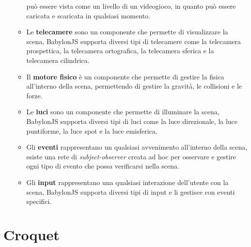 \begin{itemize}
\begin{itemize}
        può essere vista come un livello di un videogioco, in quanto può essere caricata e scaricata in qualsiasi momento.
        \item Le \textbf{telecamere} sono un componente che permette di visualizzare la scena, BabylonJS supporta diversi tipi di telecamere come la telecamera prospettica, la telecamera ortografica,
        la telecamera sferica e la telecamera cilindrica.
        \item Il \textbf{motore fisico} è un componente che permette di gestire la fisica all'interno della scena, permettendo di gestire la gravità, le collisioni e le forze.
        \item Le \textbf{luci} sono un componente che permette di illuminare la scena, BabylonJS supporta diversi tipi di luci come la luce direzionale, la luce puntiforme, la luce spot e la luce
        emisferica.
        \item Gli \textbf{eventi} rappresentano un qualsiasi avvenimento all'interno della scena, esiste una rete di \textit{subject-observer} creata ad hoc per osservare e gestire ogni tipo
        di evento che possa verificarsi nella scena.
        \item Gli \textbf{input} rappresentano una qualsiasi interazione dell'utente con la scena, BabylonJS supporta diversi tipi di input e li gestisce con eventi specifici.
    \end{itemize}
\end{itemize}

\section{Croquet}\label{sec:Croquet}